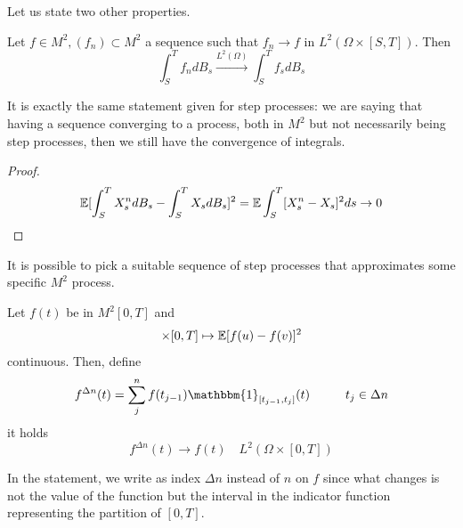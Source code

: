 Let us state two other properties.
\begin{PropBox}
    \begin{Proposition}
    Let $f \in M^2, (f_n) \subset M^2$ a sequence such that $f_n \rightarrow f$ in $L^2(\Omega \times [S,T])$. Then
    \begin{equation*}
        \int_S^T f_n dB_s \xrightarrow{L^2(\Omega)} \int_S^T f_s dB_s
    \end{equation*}
\end{Proposition}
\end{PropBox}
It is exactly the same statement given for step processes: we are saying that having a sequence converging to a process, both in $M^2$ but not necessarily being step processes, then we still have the convergence of integrals.
\begin{proof}
    \begin{equation*}
        \mathbb{E} [\int_S^TX_s^n dB_s - \int_S^T X_s dB_s]^2 = \mathbb{E} \int_S^T[X_s^n -X_s]^2 ds \rightarrow 0
    \end{equation*}
\end{proof}
It is possible to pick a suitable sequence of step processes that approximates some specific $M^2$ process. 
\begin{PropBox}
    \begin{Proposition}
    Let $f(t)$ be in $M^2[0,T]$ and 
    \begin{equation*}
        [0,T] \times [0,T] \mapsto \mE[f(u) - f(v)]^2
    \end{equation*}
    continuous. Then, define 
    \begin{equation*}
        f^{\Delta n}(t) = \sum_j ^ n f(t_{j-1})\mathbbm{1}_{[t_{j-1},t_j]}(t) \hspace{1 cm} t_j \in \Delta n
    \end{equation*}
    it holds 
    \begin{equation*}
    f^{\Delta n}(t) \rightarrow f(t) \quad L^2(\Omega \times [0,T])
    \end{equation*}
\end{Proposition}
\end{PropBox}
\begin{remark}
    In the statement, we write as index $\Delta n$ instead of $n$ on $f$ since what changes is not the value of the function but the interval in the indicator function representing the partition of $[0,T]$. 
\end{remark}
